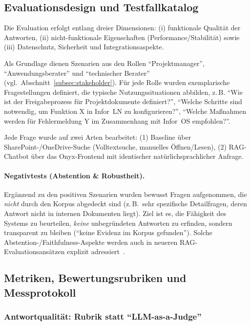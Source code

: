 \subsection{Evaluationsdesign und Testfallkatalog}\label{subsec:evaluationsdesign}

Die Evaluation erfolgt entlang dreier Dimensionen:
(i) funktionale Qualität der Antworten, (ii) nicht-funktionale Eigenschaften (Performance/Stabilität) sowie (iii) Datenschutz, Sicherheit und Integrationsaspekte.

Als Grundlage dienen Szenarien aus den Rollen \enquote{Projektmanager}, \enquote{Anwendungsberater} und \enquote{technischer Berater} (vgl.\ Abschnitt~\ref{subsec:stakeholder}).
Für jede Rolle wurden exemplarische Fragestellungen definiert, die typische Nutzungssituationen abbilden, z.\,B.\:
\enquote{Wie ist der Freigabeprozess für Projektdokumente definiert?},
\enquote{Welche Schritte sind notwendig, um Funktion X in Infor~LN zu konfigurieren?},
\enquote{Welche Maßnahmen werden für Fehlermeldung Y im Zusammenhang mit Infor~OS empfohlen?}.

Jede Frage wurde auf zwei Arten bearbeitet:
(1) Baseline über SharePoint-/OneDrive-Suche (Volltextsuche, manuelles Öffnen/Lesen),
(2) RAG-Chatbot über das Onyx-Frontend mit identischer natürlichsprachlicher Anfrage.

\paragraph{Negativtests (Abstention \& Robustheit).}
Ergänzend zu den positiven Szenarien wurden bewusst Fragen aufgenommen, die \emph{nicht} durch den Korpus abgedeckt sind (z.\,B.\ sehr spezifische Detailfragen, deren Antwort nicht in internen Dokumenten liegt).
Ziel ist es, die Fähigkeit des Systems zu beurteilen, \emph{keine} unbegründeten Antworten zu erfinden, sondern transparent zu bleiben (\enquote{keine Evidenz im Korpus gefunden}).
Solche Abstention-/Faithfulness-Aspekte werden auch in neueren RAG-Evaluationsansätzen explizit adressiert~\cite{ragas}.

\subsection{Metriken, Bewertungsrubriken und Messprotokoll}\label{subsec:eval-metriken}

\subsubsection{Antwortqualität: Rubrik statt \enquote{LLM-as-a-Judge}}\label{subsec:eval-rubrik}

